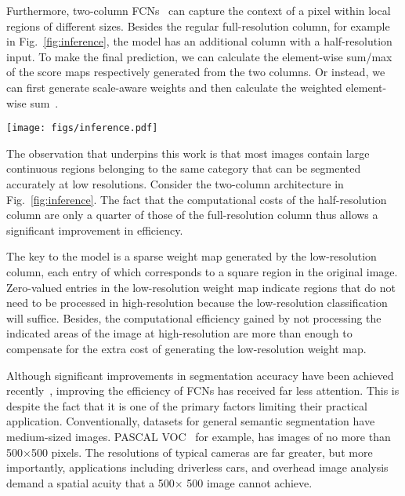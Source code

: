 \documentclass[10pt,twocolumn,letterpaper]{article}
\begin{document}
Furthermore, two-column FCNs~\cite{Attention2Scale.2015.Chen} can capture the context of a pixel within local regions of different sizes.
Besides the regular full-resolution column, for example in Fig.~\ref{fig:inference},
the model has an additional column with a half-resolution input.
To make the final prediction,
we can calculate the element-wise sum/max of the score maps respectively generated from the two columns.
Or instead, we can first generate scale-aware weights and then calculate the weighted element-wise sum~\cite{Attention2Scale.2015.Chen}.

\begin{figure*}[t]
\begin{center}
\texttt{[image: figs/inference.pdf]}
\end{center}
\caption{
The inference pipeline of our proposed method.
Depending on the spatially sparse weights generated by the half-resolution column,
we skip part of the local regions in the full-resolution column.
}
\label{fig:inference}
%
\end{figure*}


%
%
%
%
%
%
%

The observation that underpins this work is that most images contain large continuous regions belonging to the same category that can be segmented accurately at low resolutions.
Consider the two-column architecture in Fig.~\ref{fig:inference}.
The fact that the computational costs of the half-resolution column are only a quarter of those of the full-resolution column thus allows a significant improvement in efficiency.

%
The key to the model is a sparse weight map generated by the low-resolution column,
each entry of which corresponds to a square region in the original image.
%
Zero-valued entries in the low-resolution weight map indicate regions that do not need to be processed in high-resolution because the low-resolution classification will suffice.
Besides, the computational efficiency gained by not processing the indicated areas of the image at high-resolution are more than enough to compensate for the extra cost of generating the low-resolution weight map.

Although significant improvements in segmentation accuracy have been achieved recently~\cite{DeepLab2.2016.Chen,PSPNet.2016.Zhao},
improving the efficiency of FCNs has received far less attention.
This is despite the fact that it is one of the primary factors limiting their practical application.
Conventionally, datasets for general semantic segmentation have medium-sized images.
PASCAL VOC~\cite{PascalVoc.IJCV.2014.Everingham} for example, has images of no more than 500$\times$500 pixels.
%
The resolutions of typical cameras are far greater, but more importantly,
applications including driverless cars, and overhead image analysis demand a spatial acuity that a 500$\times$ 500 image cannot achieve.  
\end{document}
